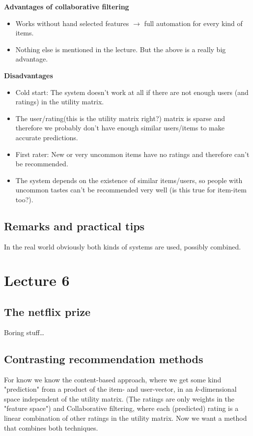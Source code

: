 \documentclass[]{article}
\begin{document}
\textbf{Advantages of collaborative filtering}
\begin{itemize}
\item Works without hand selected features $\rightarrow$ full automation for every kind of items.
\item Nothing else is mentioned in the lecture. But the above is a really big advantage.
\end{itemize}
\textbf{Disadvantages}
\begin{itemize}
\item Cold start: The system doesn't work at all if there are not enough users (and ratings) in the utility matrix.
\item The user/rating(this is the utility matrix right?) matrix is sparse and therefore we probably don't have enough similar users/items to make accurate predictions.
\item First rater: New or very uncommon items have no ratings and therefore can't be recommended.
\item The system depends on the existence of similar items/users, so people with uncommon tastes can't be recommended very well (is this true for item-item too?).
\end{itemize}
\subsection{Remarks and practical tips}
In the real world obviously both kinds of systems are used, possibly combined.
\section{Lecture 6}

\subsection{The netflix prize}
Boring stuff\dots

\subsection{Contrasting recommendation methods}
For know we know the content-based approach, where we get some kind "prediction" from a product of the item- and user-vector, in an $k$-dimensional space independent of the utility matrix. (The ratings are only weights in the "feature space") and Collaborative filtering, where each (predicted) rating is a linear combination of other ratings in the utility matrix.
Now we want a method that combines both techniques.
\end{document}
